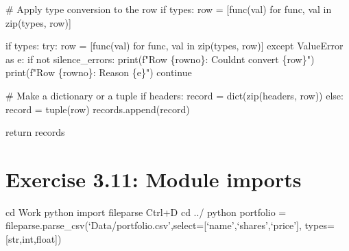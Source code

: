 \documentclass[
  letterpaper,
  DIV=11,
  numbers=noendperiod]{scrreprt}
\newenvironment{Shaded}{\begin{snugshade}}{\end{snugshade}}
\newcommand{\BuiltInTok}[1]{\textcolor[rgb]{0.00,0.46,0.62}{#1}}
\newcommand{\CommentTok}[1]{\textcolor[rgb]{0.37,0.37,0.37}{#1}}
\newcommand{\ControlFlowTok}[1]{\textcolor[rgb]{0.00,0.46,0.62}{#1}}
\newcommand{\ImportTok}[1]{\textcolor[rgb]{0.00,0.46,0.62}{#1}}
\newcommand{\KeywordTok}[1]{\textcolor[rgb]{0.00,0.46,0.62}{#1}}
\newcommand{\NormalTok}[1]{\textcolor[rgb]{0.00,0.46,0.62}{#1}}
\newcommand{\OperatorTok}[1]{\textcolor[rgb]{0.37,0.37,0.37}{#1}}
\newcommand{\PreprocessorTok}[1]{\textcolor[rgb]{0.68,0.00,0.00}{#1}}
\newcommand{\SpecialCharTok}[1]{\textcolor[rgb]{0.37,0.37,0.37}{#1}}
\newcommand{\SpecialStringTok}[1]{\textcolor[rgb]{0.13,0.47,0.30}{#1}}
\begin{document}
\begin{Shaded}
\begin{Highlighting}[]
            \CommentTok{\# Apply type conversion to the row}
            \ControlFlowTok{if}\NormalTok{ types:}
\NormalTok{                row }\OperatorTok{=}\NormalTok{ [func(val) }\ControlFlowTok{for}\NormalTok{ func, val }\KeywordTok{in} \BuiltInTok{zip}\NormalTok{(types, row)]}
        
            \ControlFlowTok{if}\NormalTok{ types:}
                \ControlFlowTok{try}\NormalTok{:}
\NormalTok{                    row }\OperatorTok{=}\NormalTok{ [func(val) }\ControlFlowTok{for}\NormalTok{ func, val }\KeywordTok{in} \BuiltInTok{zip}\NormalTok{(types, row)]}
                \ControlFlowTok{except} \PreprocessorTok{ValueError} \ImportTok{as}\NormalTok{ e:}
                    \ControlFlowTok{if} \KeywordTok{not}\NormalTok{ silence\_errors:}
                        \BuiltInTok{print}\NormalTok{(}\SpecialStringTok{f"Row }\SpecialCharTok{\{}\NormalTok{rowno}\SpecialCharTok{\}}\SpecialStringTok{: Couldn\textquotesingle{}t convert }\SpecialCharTok{\{}\NormalTok{row}\SpecialCharTok{\}}\SpecialStringTok{"}\NormalTok{)}
                        \BuiltInTok{print}\NormalTok{(}\SpecialStringTok{f"Row }\SpecialCharTok{\{}\NormalTok{rowno}\SpecialCharTok{\}}\SpecialStringTok{: Reason }\SpecialCharTok{\{}\NormalTok{e}\SpecialCharTok{\}}\SpecialStringTok{"}\NormalTok{)}
                    \ControlFlowTok{continue}

            \CommentTok{\# Make a dictionary or a tuple}
            \ControlFlowTok{if}\NormalTok{ headers:}
\NormalTok{                record }\OperatorTok{=} \BuiltInTok{dict}\NormalTok{(}\BuiltInTok{zip}\NormalTok{(headers, row))}
            \ControlFlowTok{else}\NormalTok{:}
\NormalTok{                record }\OperatorTok{=} \BuiltInTok{tuple}\NormalTok{(row)}
\NormalTok{            records.append(record)}

        \ControlFlowTok{return}\NormalTok{ records}
\end{Highlighting}
\end{Shaded}

\hypertarget{exercise-3.11-module-imports}{%
\section{Exercise 3.11: Module
imports}\label{exercise-3.11-module-imports}}

cd Work python import fileparse Ctrl+D cd ../ python portfolio =
fileparse.parse\_csv(`Data/portfolio.csv',select={[}`name',`shares',`price'{]},
types={[}str,int,float{]})
\end{document}
